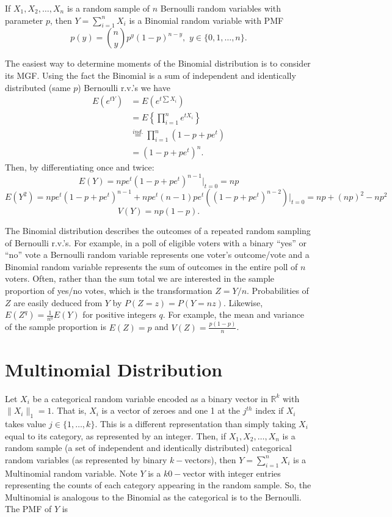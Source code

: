 \documentclass[
]{book}
\begin{document}
If \(X_1,X_2,\ldots, X_n\) is a random sample of \(n\) Bernoulli random variables with parameter \(p\), then \(Y = \sum_{i=1}^n X_i\) is a Binomial random variable with PMF
\[p(y) = {n \choose y}p^y(1-p)^{n-y}, \,\, y\in \{0, 1,\ldots, n\}.\]

The easiest way to determine moments of the Binomial distribution is to consider its MGF. Using the fact the Binomial is a sum of independent and identically distributed (same \(p\)) Bernoulli r.v.'s we have
\begin{align*}
E(e^{tY}) & = E(e^{t\sum X_i}) \\
& = E\left\{\prod_{i=1}^n e^{t X_i}\right\}\\
& \stackrel{ind.}{=} \prod_{i=1}^n (1-p + pe^t)\\
& = (1-p + pe^t)^n.
\end{align*}
Then, by differentiating once and twice:
\[E(Y) = npe^t(1-p + pe^t)^{n-1}|_{t=0} = np\]
\[E(Y^2) = npe^t(1-p + pe^t)^{n-1} + npe^t(n-1)pe^t((1-p + pe^t)^{n-2})|_{t=0} = np+(np)^2-np^2\]
\[V(Y) = np(1-p).\]

The Binomial distribution describes the outcomes of a repeated random sampling of Bernoulli r.v.'s. For example, in a poll of eligible voters with a binary ``yes'' or ``no'' vote a Bernoulli random variable represents one voter's outcome/vote and a Binomial random variable represents the sum of outcomes in the entire poll of \(n\) voters. Often, rather than the sum total we are interested in the sample proportion of yes/no votes, which is the transformation \(Z = Y/n\). Probabilities of \(Z\) are easily deduced from \(Y\) by \(P(Z = z) = P(Y = nz)\). Likewise, \(E(Z^q) = \frac{1}{n^q}E(Y)\) for positive integers \(q\). For example, the mean and variance of the sample proportion is \(E(Z) = p\) and \(V(Z) = \frac{p(1-p)}{n}\).

\hypertarget{multinomial-distribution}{%
\section{Multinomial Distribution}\label{multinomial-distribution}}

Let \(X_i\) be a categorical random variable encoded as a binary vector in \(\mathbb{R}^k\) with \(\|X_i\|_1 = 1\). That is, \(X_i\) is a vector of zeroes and one 1 at the \(j^{th}\) index if \(X_i\) takes value \(j \in \{1,\ldots, k\}\). This is a different representation than simply taking \(X_i\) equal to its category, as represented by an integer. Then, if \(X_1, X_2, \ldots, X_n\) is a random sample (a set of independent and identically distributed) categorical random variables (as represented by binary \(k-\)vectors), then \(Y = \sum_{i=1}^n X_i\) is a Multinomial random variable. Note \(Y\) is a \(k0-\)vector with integer entries representing the counts of each category appearing in the random sample. So, the Multinomial is analogous to the Binomial as the categorical is to the Bernoulli. The PMF of \(Y\) is
\end{document}

